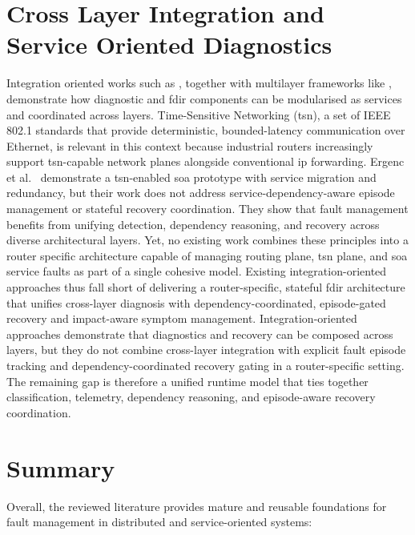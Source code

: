 \section{Cross Layer Integration and Service Oriented Diagnostics}\label{sec:lit-cross-layer}

Integration oriented works such as \cite{ref29,ref15}, together with multilayer frameworks like \cite{ref2}, demonstrate how diagnostic and \gls{fdir} components can be modularised as services and coordinated across layers. Time-Sensitive Networking (\gls{tsn}), a set of IEEE 802.1 standards that provide deterministic, bounded-latency communication over Ethernet, is relevant in this context because industrial routers increasingly support \gls{tsn}-capable network planes alongside conventional \gls{ip} forwarding. Ergenc et al.\ \cite{ref26} demonstrate a \gls{tsn}-enabled \gls{soa} prototype with service migration and redundancy, but
their work does not address service-dependency-aware episode management or stateful recovery coordination. They show that fault management benefits from unifying detection, dependency reasoning, and recovery across diverse architectural layers. Yet, no existing work combines these principles into a router specific architecture capable of managing routing plane, \gls{tsn} plane, and \gls{soa} service faults as part of a single cohesive model. Existing integration-oriented approaches thus fall short of delivering a router-specific, stateful \gls{fdir} architecture that unifies cross-layer diagnosis with dependency-coordinated, episode-gated recovery and impact-aware symptom management. Integration-oriented approaches demonstrate that diagnostics and recovery can be composed across layers, but they do not combine cross-layer integration with explicit fault episode tracking and dependency-coordinated recovery gating in a router-specific setting. The remaining gap is therefore a unified runtime model that ties together classification, telemetry, dependency reasoning, and episode-aware recovery coordination.

\section{Summary}\label{sec:lit-summary}

Overall, the reviewed literature provides mature and reusable foundations for fault management in distributed and service-oriented systems:

